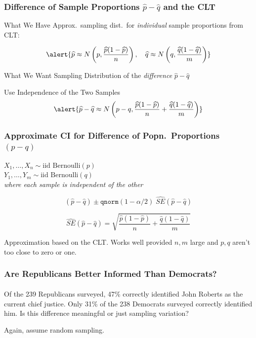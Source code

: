 \begin{frame}
\frametitle{Difference of Sample Proportions $\widehat{p}-\widehat{q}$ and the CLT}
\begin{block}{What We Have}
Approx.\ sampling dist.\ for \emph{individual} sample proportions from CLT:

\[\alert{\widehat{p} \approx N\left(p, \frac{\widehat{p}(1 - \widehat{p})}{n}\right), \quad \widehat{q} \approx N\left(q, \frac{\widehat{q}(1 - \widehat{q})}{m}\right)}\]
\end{block}

\begin{block}{What We Want}
Sampling Distribution of the \emph{difference} $\widehat{p} - \widehat{q}$
\end{block}

\begin{block}{Use Independence of the Two Samples}
  \[\alert{\widehat{p} - \widehat{q} \approx N\left( p - q, \frac{\widehat{p}(1 - \widehat{p})}{n} + \frac{\widehat{q} (1 - \widehat{q})}{m}\right)}\]
\end{block}

\end{frame}
\begin{frame}

\frametitle{Approximate CI for Difference of Popn.\ Proportions $(p-q)$}


$X_1, \hdots, X_n \sim \mbox{iid Bernoulli}(p)$ \\
$Y_1, \hdots, Y_m \sim \mbox{iid Bernoulli}(q)$ \\
\emph{where each sample is independent of the other } 


  \[(\widehat{p} - \widehat{q}) \pm \texttt{qnorm}(1-\alpha/2)\; \widehat{SE}(\widehat{p} - \widehat{q})\] 

  \[
    \widehat{SE}(\widehat{p} - \widehat{q}) = \sqrt{\frac{\widehat{p}(1 - \widehat{p})}{n} + \frac{\widehat{q}(1 - \widehat{q})}{m}}
  \]


	\alert{Approximation based on the CLT. Works well provided $n,m$ large and $p,q$ aren't too close to zero or one.}

\end{frame}
\begin{frame}
\frametitle{Are Republicans Better Informed Than Democrats?}
\framesubtitle{}
Of the 239 Republicans surveyed, 47\% correctly identified John Roberts as the current chief justice. Only 31\% of the 238 Democrats surveyed correctly identified him. Is this difference meaningful or just sampling variation?

\vspace{2em}
\alert{Again, assume random sampling.}


\end{frame}

